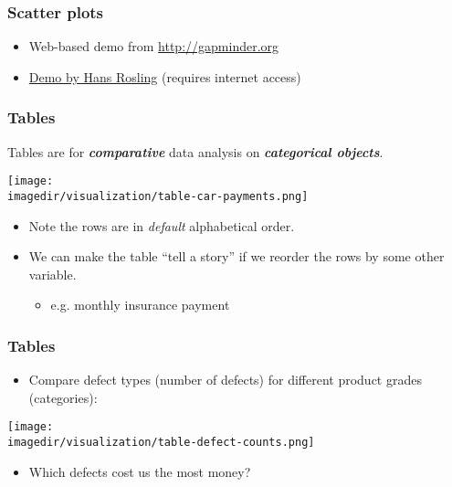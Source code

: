 \begin{frame}\frametitle{Scatter plots}
	\begin{itemize}
		\item	Web-based demo from \href{http://gapminder.org}{http://gapminder.org} 
		\item	\href{http://www.youtube.com/v/jbkSRLYSojo}{Demo by Hans Rosling} (requires internet access) 
	\end{itemize}
\end{frame}

\begin{frame}\frametitle{Tables}
	
	Tables are for \textbf{\emph{comparative}} data analysis on \textbf{\emph{categorical objects}}.
	\begin{center}
		\texttt{[image: \\imagedir/visualization/table-car-payments.png]}
	\end{center}
	\begin{itemize}
		\item	Note the rows are in \emph{default} alphabetical order. 
		\item	We can make the table ``tell a story'' if we reorder the rows by some other variable. 
		\begin{itemize}
			\item	e.g. monthly insurance payment 
		\end{itemize}
	\end{itemize}
\end{frame}

\begin{frame}\frametitle{Tables}
	\begin{itemize}
		\item	Compare defect types (number of defects) for different product grades (categories): 
	\end{itemize}
	\begin{center}
		\texttt{[image: \\imagedir/visualization/table-defect-counts.png]}
	\end{center}
	\begin{itemize}
		\item	Which defects cost us the most money? 
	\end{itemize}
\end{frame}


